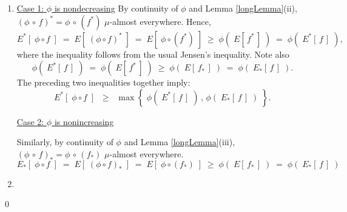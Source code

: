 \begin{enumerate}
\item
	\underline{Case 1: $\phi$ is nondecreasing}
	\vskip 0.0cm
	\noindent
	By continuity of $\phi$ and Lemma \ref{longLemma}(ii),
	$(\phi\,\circ\,f)^{*} = \phi\,\circ\,(f^{*})$ $\mu$-almost everywhere.
	Hence,
	\begin{equation*}
	E^{*}\!\left[\;\phi \circ f\;\right]
		\;=\; E\!\left[\;(\phi \circ f)^{*}\;\right]
		\;=\; E\!\left[\;\phi \circ (f^{*})\;\right]
		\;\geq\; \phi(\;E[\,f^{*}\,]\;)
		\;=\; \phi(\;E^{*}[\,f\,]\;),
	\end{equation*}
	where the inequality follows from the usual Jensen's inequality.
	Note also
	\begin{equation*}
	\phi(\;E^{*}[\,f\,]\;)
		\;=\; \phi(\;E[\,f^{*}\,]\;)
		\;\geq\; \phi(\;E[\,f_{*}\,]\;)
		\;=\; \phi(\;E_{*}[\,f\,]\;).
	\end{equation*}
	The preceding two inequalities together imply:
	\begin{equation*}
	E^{*}\!\left[\;\phi \circ f\;\right]
		\;\;\geq\;\; \max\!\left\{\;\phi(\;E^{*}[\,f\,]\;) \,,\, \phi(\;E_{*}[\,f\,]\;)\;\right\}.
	\end{equation*}

	\vskip 0.0cm
	\underline{Case 2: $\phi$ is nonincreasing}
	\vskip 0.0cm
	\noindent

	\vskip 0.0cm
	\noindent
	Similarly, by continuity of $\phi$ and Lemma \ref{longLemma}(iii),
	$(\phi\,\circ\,f)_{*} = \phi\,\circ\,(f_{*})$ $\mu$-almost everywhere.
	\begin{equation*}
	E_{*}\!\left[\;\phi \circ f\;\right]
		\;=\; E\!\left[\;(\phi \circ f)_{*}\;\right]
		\;=\; E\!\left[\;\phi \circ (f_{*})\;\right]
		\;\geq\; \phi(\;E[\,f_{*}\,]\;)
		\;=\; \phi(\;E_{*}[\,f\,]\;)
	\end{equation*}
\item
\end{enumerate}

\qed



\renewcommand{\theenumi}{\roman{enumi}}
\renewcommand{\labelenumi}{\textnormal{(\theenumi)}$\;\;$}

